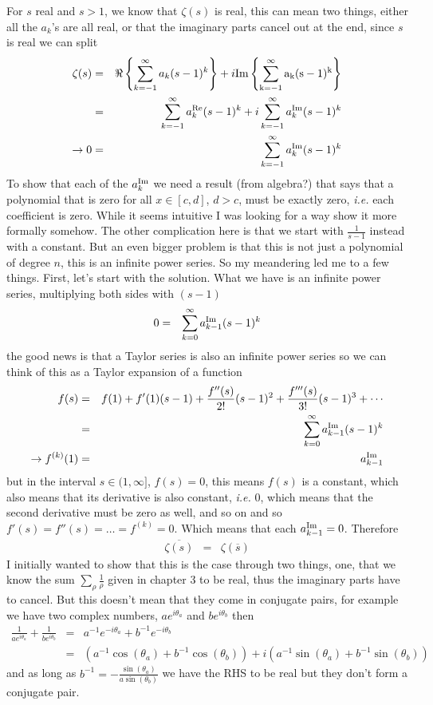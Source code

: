 \documentclass[aps,preprint,preprintnumbers,nofootinbib,showpacs,prd]{revtex4-1}
\newcommand{\ie}{{\it i.e.} }
\newcommand{\nbea}{\begin{eqnarray*}}
\newcommand{\neea}{\end{eqnarray*}}
\def\Im{\rm Im}
\begin{document}
For $s$ real and $s > 1$, we know that $\zeta(s)$ is real, this can mean two things, either all the $a_k$'s are all real, or that the imaginary parts cancel out at the end, since $s$ is real we can split
%
\nbea
\zeta(s) & = & \Re\left\{\sum_{k=-1}^\infty a_k (s-1)^k\right\} + i\Im\left\{ \sum_{k=-1}^\infty a_k (s-1)^k \right\} \\
& = & \sum_{k=-1}^\infty a^{\rm Re}_k (s-1)^k + i\sum_{k=-1}^\infty a^{\rm Im}_k (s-1)^k \\
\to 0 & = & \sum_{k=-1}^\infty a^{\rm Im}_k (s-1)^k
\neea
%
To show that each of the $a^{\rm Im}_k$ we need a result (from algebra?) that says that a polynomial that is zero for all $x\in [c,d]$, $d > c$, must be exactly zero, \ie each coefficient is zero. While it seems intuitive I was looking for a way show it more formally somehow. The other complication here is that we start with $\frac{1}{s-1}$ instead with a constant. But an even bigger problem is that this is not just a polynomial of degree $n$, this is an infinite power series. So my meandering led me to a few things. First, let's start with the solution. What we have is an infinite power series, multiplying both sides with $(s-1)$
%
\nbea
0 & = & \sum_{k=0}^\infty a_{k-1}^{\rm Im} (s-1)^k 
\neea
%
the good news is that a Taylor series is also an infinite power series so we can think of this as a Taylor expansion of a function
%
\nbea
f(s) & = & f(1) + f'(1)(s-1) + \frac{f''(s)}{2!}(s-1)^2 + \frac{f'''(s)}{3!}(s-1)^3 + \cdots \\
& = & \sum_{k=0}^\infty a_{k-1}^{\rm Im} (s-1)^k \\
\to f^{(k)}(1) & = & a_{k-1}^{\rm Im}
\neea
%
but in the interval $s \in (1,\infty]$, $f(s) = 0$, this means $f(s)$ is a constant, which also means that its derivative is also constant, \ie 0, which means that the second derivative must be zero as well, and so on and so $f'(s) = f''(s) = \dots = f^{(k)} = 0$. Which means that each $a_{k-1}^{\rm Im} = 0$. Therefore
%
\nbea
\overline{\zeta(s)} & = & \zeta(\overline{s})
\neea
%
I initially wanted to show that this is the case through two things, one, that we know the sum $\sum_{\rho} \frac{1}{\rho}$ given in chapter 3 to be real, thus the imaginary parts have to cancel. But this doesn't mean that they come in conjugate pairs, for example  we have two complex numbers, $ae^{i\theta_a}$ and $be^{i\theta_b}$ then
%
\nbea
\frac{1}{a e^{i\theta_a}} + \frac{1}{b e^{i\theta_b}} & = & a^{-1} e^{-i\theta_a} + b^{-1} e^{-i\theta_b} \\
& = & (a^{-1} \cos(\theta_a) + b^{-1} \cos(\theta_b)) + i(a^{-1}\sin(\theta_a) + b^{-1}\sin(\theta_b))
\neea
%
and as long as $b^{-1} = -\frac{\sin(\theta_a)}{a \sin(\theta_b)}$ we have the RHS to be real but they don't form a conjugate pair.
\end{document}
